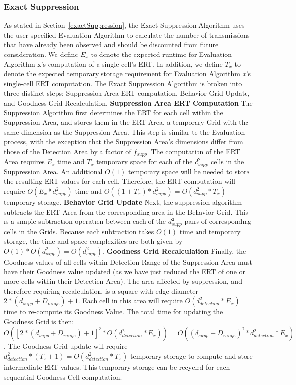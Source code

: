 \subsubsection{Exact Suppression}
As stated in Section~\ref{exactSuppression}, the Exact Suppression Algorithm uses the user-specified Evaluation Algorithm to calculate the number of transmissions that have already been observed and should be discounted from future consideration.  We define $E_{x}$ to denote the expected runtime for Evaluation Algorithm x's computation of a single cell's ERT.  In addition, we define $T_{x}$ to denote the expected temporary storage requirement for Evaluation Algorithm $x$'s single-cell ERT computation.  The Exact Suppression Algorithm is broken into three distinct steps: Suppression Area ERT computation, Behavior Grid Update, and Goodness Grid Recalculation.
\newline
\newline 
\textbf{Suppression Area ERT Computation}\newline
The Suppression Algorithm first determines the ERT for each cell within the Suppression Area, and stores them in the ERT Area, a temporary Grid with the same dimension as the Suppression Area.  This step is similar to the Evaluation process, with the exception that the Suppression Area's dimensions differ from those of the Detection Area by a factor of $f_{supp}$.  The computation of the ERT Area requires $E_{x}$ time and  $T_x$ temporary space for each of the $d_{supp}^2$ cells in the Suppression Area.  An additional  $O(1)$ temporary space will be needed to store the resulting ERT values for each cell.  Therefore, the ERT computation will require $O(E_{x} * d_{supp}^2)$ time and $O((1 + T_x)* d_{supp}^2) = O(d_{supp}^2 * T_x)$ temporary storage.
\newline
\newline
\textbf{Behavior Grid Update}\newline
Next, the suppression algorithm subtracts the ERT Area from the corresponding area in the Behavior Grid.  This is a simple subtraction operation between each of the $d_{supp}^2$ pairs of corresponding cells in the Grids.  Because each subtraction takes $O(1)$ time and temporary storage, the time and space complexities are both given by $O(1) * O(d_{supp}^2) = O(d_{supp}^2)$.
\textbf{Goodness Grid Recalculation}\newline
Finally, the Goodness values of all cells within Detection Range of the Suppression Area must have their Goodness value updated (as we have just reduced the ERT of one or more cells within their Detection Area).  The area affected by suppression, and therefore requiring recalculation, is a square with edge diameter $2 * (d_{supp} + D_{range}) + 1$.  Each cell in this area will require  $O(d_{detection}^2 * E_x)$ time to re-compute its Goodness Value.  The total time for updating the Goodness Grid is then: $O([2 * (d_{supp} + D_{range}) + 1]^2 * O(d_{detection}^2 * E_x)) = O((d_{supp} + D_{range})^2 * d_{detection}^2 * E_x)$.  The Goodness Grid update will require $d_{detection}^2 * (T_x + 1) = O(d_{detection}^2 * T_x)$ temporary storage to compute and store intermediate ERT values.  This temporary storage can be recycled for each sequential Goodness Cell computation.


